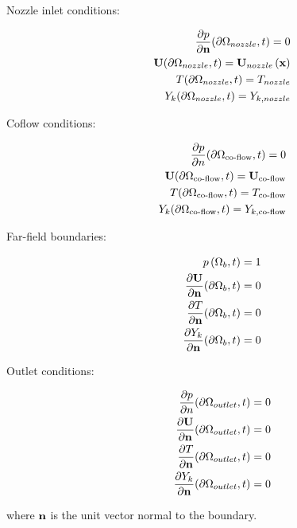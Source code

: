 \begin{description}
 \item[Nozzle inlet conditions:]
\begin{subequations}
 \begin{align}
  \frac{\partial p}{\partial \mathbf{n}}(\partial \Omega_{nozzle},t)  = 0 \\
  \mathbf{U}(\partial \Omega_{nozzle},t) = \mathbf{U}_{nozzle}\left(\mathbf{x}\right) \\
  T(\partial \Omega_{nozzle},t) = T_{nozzle} \\
  Y_k(\partial \Omega_{nozzle},t) = Y_{k,nozzle}
 \end{align}
\end{subequations}

\item[Coflow conditions:]
\begin{subequations}
 \begin{align}
  \frac{\partial p}{\partial n}(\partial \Omega_{\text{co-flow}},t)  = 0 \\
  \mathbf{U}(\partial \Omega_{\text{co-flow}},t) = \mathbf{U}_{\text{co-flow}} \\
  T(\partial \Omega_{\text{co-flow}},t) = T_{\text{co-flow}} \\
  Y_k(\partial \Omega_{\text{co-flow}},t) = Y_{k,\text{co-flow}}
 \end{align}
\end{subequations}

\item[Far-field boundaries:]
\begin{subequations}
 \begin{align}
  p \left( \Omega_b,t \right) &= 1 \\ %
  \frac{\partial \bv{U}}{\partial \bv{n}} (\partial \Omega_b,t) &= 0 \\
  \frac{\partial T}{\partial \bv{n}} (\partial \Omega_b,t) &= 0 \\
  \frac{\partial Y_k}{\partial \bv{n}}(\partial \Omega_b,t) &= 0 
 \end{align}
\end{subequations}

\item[Outlet conditions:]
\begin{subequations}
 \begin{align}
  \frac{\partial p}{\partial n}(\partial \Omega_{outlet},t)  &= 0 \\
  \frac{\partial \mathbf{U}}{\partial \mathbf{n}} (\partial \Omega_{outlet},t) &= 0 \\
  \frac{\partial T}{\partial \mathbf{n}} (\partial \Omega_{outlet},t) &= 0 \\
  \frac{\partial Y_k}{\partial \mathbf{n}}(\partial \Omega_{outlet},t) &= 0 
 \end{align}
\end{subequations}
 \end{description}
where $\mathbf{n}$ is the unit vector normal to the boundary.

